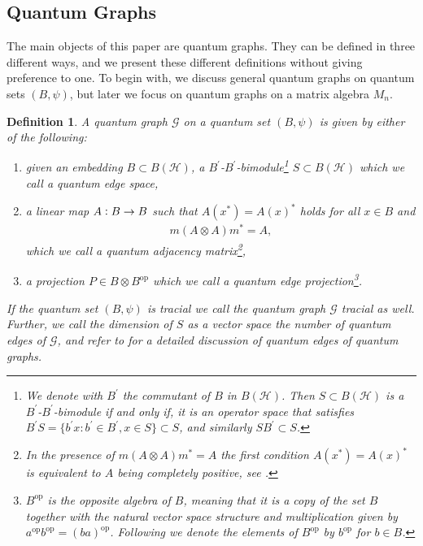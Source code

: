 \documentclass{amsart}
\newtheorem{definition}[thm]{Definition}
\newcommand{\cc}{\vcentcolon}
\begin{document}
\subsection{Quantum Graphs}

The main objects of this paper are quantum graphs. They can be defined in three different ways, and we  present these different definitions without giving preference to one. To begin with, we discuss general quantum graphs on quantum sets $(B, \psi)$, but later we focus on quantum graphs on a matrix algebra $M_n$.

\begin{definition}
    \label{pre::def:qgraph}\label{def:quantumGraph}  
    A \emph{quantum graph} $\mathcal{G}$ on a quantum set $(B, \psi)$ is given by either of the following:
    \begin{enumerate}
        \item given an embedding $B \subset B(\mathcal{H})$, a $B^\prime$-$B^\prime$-bimodule\footnote{We denote with $B^\prime$ the commutant of $B$ in $B(\mathcal{H})$. Then $S \subset B(\mathcal{H})$ is a $B^\prime$-$B^\prime$-bimodule if and only if, it is an operator space that satisfies $B^\prime S = \{b^\prime x: b^\prime \in B^\prime, x \in S\} \subset S$, and similarly $S B^\prime \subset S$.}
         $S \subset B(\mathcal{H})$ which we call a \emph{quantum edge space},
        \item a linear map $A \cc B \to B$ such that $A(x^\ast) = A(x)^\ast$ holds for all $x \in B$ and 
        \begin{align*}
            m(A\otimes A)m^*=A,
        \end{align*}
        which we call a \emph{quantum adjacency matrix}\footnote{In the presence of $m(A \otimes A)m^\ast = A$ the first condition $A(x^\ast)=A(x)^\ast$ is equivalent to $A$ being completely positive, see \cite{matsuda_classification_2022}.},
        \item a projection $P \in B \otimes B^{\mathrm{op}}$ 
        which we call a \emph{quantum edge projection}\footnote{$B^{\mathrm{op}}$ is the opposite algebra of $B$, 
        meaning that it is a copy of the set $B$ together with the natural vector space structure and multiplication given by $a^{\mathrm{op}} b^{\mathrm{op}} = (ba)^{\mathrm{op}}$.
        Following \cite{wasilewski_quantum_2024} 
        we denote the elements of $B^{\mathrm{op}}$ by 
        $b^{\mathrm{op}}$
        for $b \in B$.}.
    \end{enumerate}
    If the quantum set $(B, \psi)$ is tracial we call the quantum graph $\mathcal{G}$ tracial as well. Further, we call the dimension of $S$ as a vector space the number of \emph{quantum edges} of $\mathcal{G}$, and refer to \cite[Section 2.3]{gromada_examples_2022} for a detailed discussion of quantum edges of quantum graphs.
\end{definition}
\end{document}

